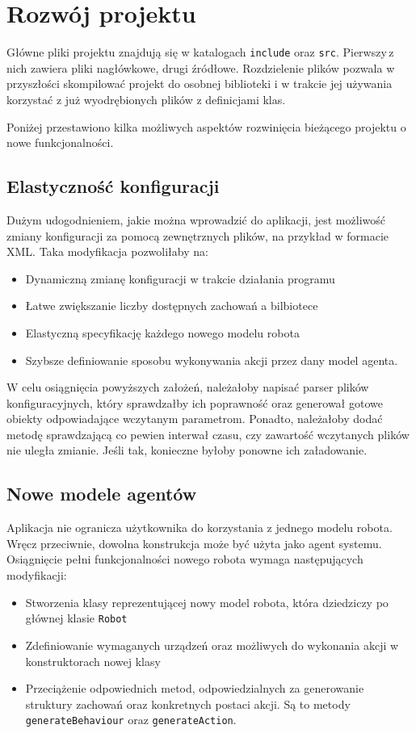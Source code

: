 \section{Rozwój projektu}
\label{app:rozwoj_projektu}

Główne pliki projektu znajdują się w katalogach {\tt include} oraz {\tt src}. Pierwszy\,z nich zawiera pliki nagłówkowe, drugi źródłowe. Rozdzielenie plików pozwala w\,przyszłości skompilować projekt do osobnej biblioteki i w trakcie jej używania korzystać z już wyodrębionych plików z definicjami klas.

Poniżej przestawiono kilka możliwych aspektów rozwinięcia bieżącego projektu o nowe funkcjonalności.

\subsection{Elastyczność konfiguracji}

Dużym udogodnieniem, jakie można wprowadzić do aplikacji, jest możliwość zmiany konfiguracji za pomocą zewnętrznych plików, na przykład w formacie XML. Taka modyfikacja pozwoliłaby na:
\begin{itemize}
    \item Dynamiczną zmianę konfiguracji w trakcie działania programu
    \item Łatwe zwiększanie liczby dostępnych zachowań a bilbiotece
    \item Elastyczną specyfikację każdego nowego modelu robota
    \item Szybsze definiowanie sposobu wykonywania akcji przez dany model agenta.
\end{itemize}

W celu osiągnięcia powyższych założeń, należałoby napisać parser plików konfiguracyjnych, który sprawdzałby ich poprawność oraz generował gotowe obiekty odpowiadające wczytanym parametrom. Ponadto, należałoby dodać metodę sprawdzającą co pewien interwał czasu, czy zawartość wczytanych plików nie uległa zmianie. Jeśli tak, konieczne byłoby ponowne ich załadowanie.

\subsection{Nowe modele agentów}

Aplikacja nie ogranicza użytkownika do korzystania z jednego modelu robota. Wręcz przeciwnie, dowolna konstrukcja może być użyta jako agent systemu. Osiągnięcie pełni funkcjonalności nowego robota wymaga następujących modyfikacji:
\begin{itemize}
    \item Stworzenia klasy reprezentującej nowy model robota, która dziedziczy po\,głównej klasie {\tt Robot}
    \item Zdefiniowanie wymaganych urządzeń oraz możliwych do wykonania akcji w\,konstruktorach nowej klasy
    \item Przeciążenie odpowiednich metod, odpowiedzialnych za generowanie struktury zachowań oraz konkretnych postaci akcji. Są to metody {\tt generateBehaviour} oraz {\tt generateAction}.
\end{itemize}

